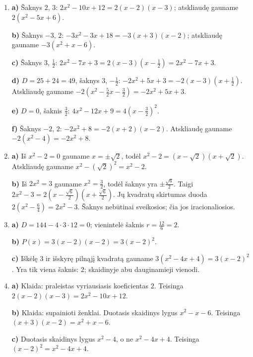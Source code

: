 \documentclass[12pt,a4paper]{article}
\begin{document}
\begin{enumerate}
\textbf{c)} Šaknys $0$, $5$: $x^2-5x=x(x-5)$.

\textbf{d)} Šaknys $-3$, $3$: $x^2-9=(x+3)(x-3)$.

\textbf{e)} $D=0$, šaknis $-3$: $x^2+6x+9=(x+3)^2$.

\textbf{f)} $D=0$, šaknis $0$: $x^2=x\cdot x=x^2$. Kiekvienas užrašas atskliaudus duoda pradinį daugianarį; e ir f dalyse ta pati šaknis įrašoma du kartus.
\item \textbf{a)} Šaknys $2$, $3$: $2x^2-10x+12=2(x-2)(x-3)$; atskliaudę gauname $2(x^2-5x+6)$.

\textbf{b)} Šaknys $-3$, $2$: $-3x^2-3x+18=-3(x+3)(x-2)$; atskliaudę gauname $-3(x^2+x-6)$.

\textbf{c)} Šaknys $3$, $\frac{1}{2}$: $2x^2-7x+3=2(x-3)\left(x-\frac{1}{2}\right)=2x^2-7x+3$.

\textbf{d)} $D=25+24=49$, šaknys $3$, $-\frac{1}{2}$: $-2x^2+5x+3=-2(x-3)\left(x+\frac{1}{2}\right)$. Atskliaudę gauname $-2(x^2-\frac{5}{2}x-\frac{3}{2})=-2x^2+5x+3$.

\textbf{e)} $D=0$, šaknis $\frac{3}{2}$: $4x^2-12x+9=4\left(x-\frac{3}{2}\right)^2$.

\textbf{f)} Šaknys $-2$, $2$: $-2x^2+8=-2(x+2)(x-2)$. Atskliaudę gauname $-2(x^2-4)=-2x^2+8$.
\item \textbf{a)} Iš $x^2-2=0$ gauname $x=\pm\sqrt2$, todėl $x^2-2=(x-\sqrt2)(x+\sqrt2)$. Atskliaudę gauname $x^2-(\sqrt2)^2=x^2-2$.

\textbf{b)} Iš $2x^2=3$ gauname $x^2=\frac{3}{2}$, todėl šaknys yra $\pm\frac{\sqrt6}{2}$. Taigi $2x^2-3=2\left(x-\frac{\sqrt6}{2}\right)\left(x+\frac{\sqrt6}{2}\right)$. Jų kvadratų skirtumas duoda $2\left(x^2-\frac{6}{4}\right)=2x^2-3$. Šaknys nebūtinai sveikosios; čia jos iracionaliosios.
\item \textbf{a)} $D=144-4\cdot3\cdot12=0$; vienintelė šaknis $r=\frac{12}{6}=2$.

\textbf{b)} $P(x)=3(x-2)(x-2)=3(x-2)^2$.

\textbf{c)} Iškėlę $3$ ir išskyrę pilnąjį kvadratą gauname $3(x^2-4x+4)=3(x-2)^2$. Yra tik viena šaknis: $2$; skaidinyje abu dauginamieji vienodi.
\item \textbf{a)} Klaida: praleistas vyriausiasis koeficientas $2$. Teisinga $2(x-2)(x-3)=2x^2-10x+12$.

\textbf{b)} Klaida: supainioti ženklai. Duotasis skaidinys lygus $x^2-x-6$. Teisinga $(x+3)(x-2)=x^2+x-6$.

\textbf{c)} Duotasis skaidinys lygus $x^2-4$, o ne $x^2-4x+4$. Teisinga $(x-2)^2=x^2-4x+4$.


\end{enumerate}
\end{document}
